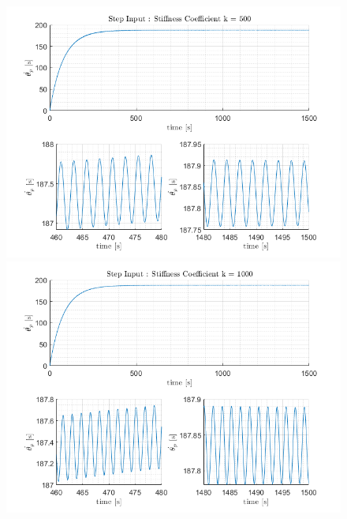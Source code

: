 \documentclass[letterpaper,12pt]{article}
\begin{document}
\begin{figure}[ht]
    \centering
    \includegraphics[scale = .8]{Images/StepInput_k500.png}
    \includegraphics[scale = .8]{Images/StepInput_k1000.png}
\end{figure}
\end{document}
